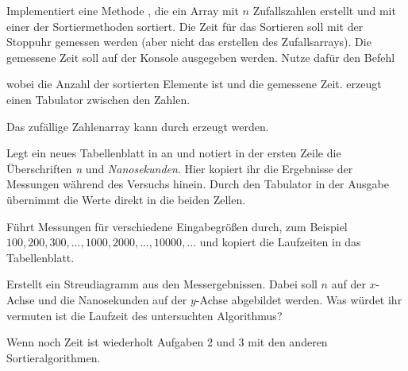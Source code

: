\documentclass[11pt, a4paper, ngerman]{arbeitsblatt}
\begin{document}
\begin{aufgabe}
	Implementiert eine Methode , die ein Array mit
	$n$ Zufallszahlen erstellt und mit einer der Sortiermethoden
	sortiert. Die Zeit für das Sortieren soll mit der Stoppuhr gemessen werden
	(aber nicht das erstellen des Zufallsarrays). Die gemessene Zeit soll auf der
	Konsole ausgegeben werden. Nutze dafür den Befehl


	wobei  die Anzahl der sortierten Elemente ist und
	 die gemessene Zeit.  erzeugt einen
	Tabulator zwischen den Zahlen.

	Das zufällige Zahlenarray kann durch  erzeugt werden.
\end{aufgabe}

\begin{aufgabe}
	Legt ein neues Tabellenblatt in  an und notiert in der
	ersten Zeile die Überschriften \emph{n} und
	\emph{Nanosekunden}. Hier kopiert ihr die Ergebnisse der Messungen während
	des Versuchs hinein. Durch den Tabulator in der Ausgabe übernimmt
	 die Werte direkt in die beiden Zellen.

	Führt Messungen für verschiedene Eingabegrößen durch, zum Beispiel
	$100, 200, 300, ..., 1000, 2000, ..., 10000, ...$ und kopiert die Laufzeiten in das Tabellenblatt.
\end{aufgabe}

\begin{aufgabe}
	Erstellt ein Streudiagramm aus den Messergebnissen. Dabei soll
	$n$ auf der $x$-Achse und die
	Nanosekunden auf der $y$-Achse abgebildet werden. Was würdet
	ihr vermuten ist die Laufzeit des untersuchten Algorithmus?
\end{aufgabe}

\bigskip
Wenn noch Zeit ist wiederholt Aufgaben 2 und 3 mit den anderen
Sortieralgorithmen.
\end{document}
